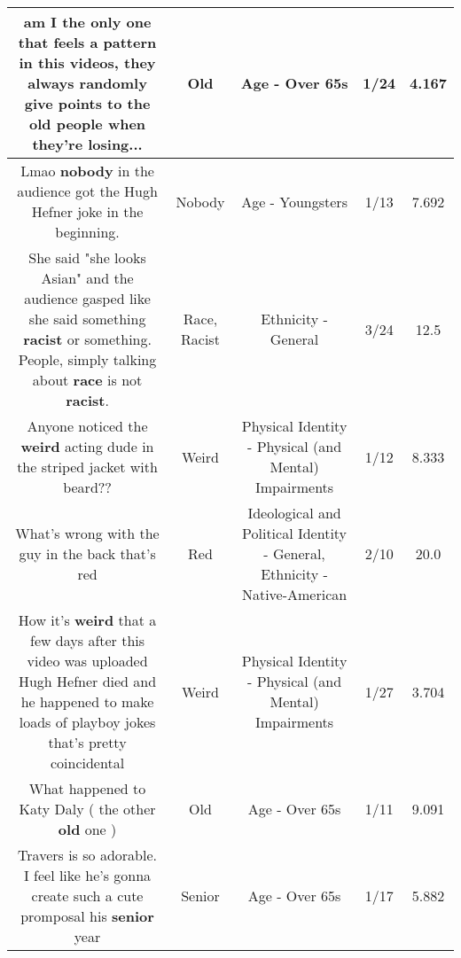 \documentclass[11pt]{article}
\newlength\mylength
\begin{document}
\begin{center}
\begin{longtable}{|C{.65\mylength}|C{.30\mylength}|C{.12\mylength}|C{.12\mylength}|C{.12\mylength}|}
  \small am I the only one that feels a pattern in this videos, they always randomly give points to the \textbf{old} people when they're losing...\normalsize   & Old & Age - Over 65s & 1/24 & 4.167 \\  \hline
  \small Lmao \textbf{nobody} in the audience got the Hugh Hefner joke in the beginning.\normalsize   & Nobody & Age - Youngsters & 1/13 & 7.692 \\  \hline
  \small She said "she looks Asian" and the audience gasped like she said something \textbf{racist} or something. People, simply talking about \textbf{race} is not \textbf{racist}.\normalsize   & Race, Racist & Ethnicity - General & 3/24 & 12.5 \\  \hline
  \small Anyone noticed the \textbf{weird} acting dude in the striped jacket with beard??\normalsize   & Weird & Physical Identity - Physical (and Mental) Impairments & 1/12 & 8.333 \\  \hline
  \small What's wrong with the guy in the back that's red\normalsize   & Red &  Ideological and Political Identity - General, Ethnicity - Native-American & 2/10 & 20.0 \\  \hline
  \small How it's \textbf{weird} that a few days after this video was uploaded Hugh Hefner died and he happened to make loads of playboy jokes that's pretty coincidental\normalsize   & Weird & Physical Identity - Physical (and Mental) Impairments & 1/27 & 3.704 \\  \hline
  \small What happened to Katy Daly ( the other \textbf{old} one )\normalsize   & Old & Age - Over 65s & 1/11 & 9.091 \\  \hline
  \small Travers is so adorable. I feel like he's gonna create such a cute promposal his \textbf{senior} year\normalsize   & Senior & Age - Over 65s & 1/17 & 5.882 \\  \hline

\end{longtable}
\end{center}
\end{document}
